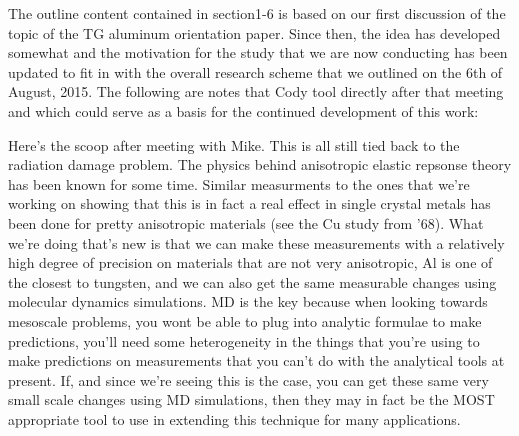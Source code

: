 
The outline content contained in section1-6 is based on our first discussion of the topic of the TG aluminum orientation paper. Since then, the idea has developed somewhat and the motivation for the study that we are now conducting has been updated to fit in with the overall research scheme that we outlined on the 6th of August, 2015. The following are notes that Cody tool directly after that meeting and which could serve as a basis for the continued development of this work:

Here's the scoop after meeting with Mike. This is all still tied back to the radiation damage problem. The physics behind anisotropic elastic repsonse theory has been known for some time. Similar measurments to the ones that we're working on showing that this is in fact a real effect in single crystal metals has been done for pretty anisotropic materials (see the Cu study from '68). What we're doing that's new is that we can make these measurements with a relatively high degree of precision on materials that are not very anisotropic, Al is one of the closest to tungsten, and we can also get the same measurable changes using molecular dynamics simulations. MD is the key because when looking towards mesoscale problems, you wont be able to plug into analytic formulae to make predictions, you'll need some heterogeneity in the things that you're using to make predictions on measurements that you can't do with the analytical tools at present. If, and since we're seeing this is the case, you can get these same very small scale changes using MD simulations, then they may in fact be the MOST appropriate tool to use in extending this technique for many applications.